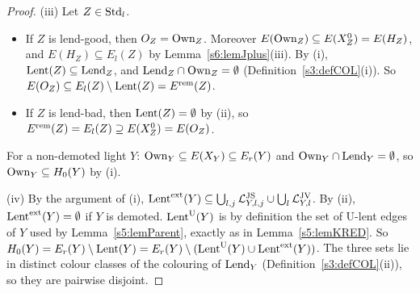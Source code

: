 \begin{proof}
(iii) Let $Z\in\mathrm{Std}_l$.
\begin{itemize}
\item If $Z$ is lend-good, then $O_Z=\mathrm{Own}_Z$. Moreover $E(\mathrm{Own}_Z)\subseteq E(X^0_Z)=E(H_Z)$, and $E(H_Z)\subseteq E_l(Z)$ by Lemma~\ref{s6:lemJplus}(iii). By (i), $\mathrm{Lent}(Z)\subseteq\mathrm{Lend}_Z$, and $\mathrm{Lend}_Z\cap\mathrm{Own}_Z=\emptyset$ (Definition~\ref{s3:defCOL}(i)). So $E(O_Z)\subseteq E_l(Z)\setminus\mathrm{Lent}(Z)=E^{\mathrm{rem}}(Z)$.
\item If $Z$ is lend-bad, then $\mathrm{Lent}(Z)=\emptyset$ by (ii), so $E^{\mathrm{rem}}(Z)=E_l(Z)\supseteq E(X^0_Z)=E(O_Z)$.
\end{itemize}
For a non-demoted light $Y$: $\mathrm{Own}_Y\subseteq E(X_Y)\subseteq E_r(Y)$ and $\mathrm{Own}_Y\cap\mathrm{Lend}_Y=\emptyset$, so $\mathrm{Own}_Y\subseteq H_0(Y)$ by (i).

(iv) By the argument of (i), $\mathrm{Lent}^{\mathrm{ext}}(Y)\subseteq\bigcup_{l,j}\mathcal{L}^{\mathrm{JS}}_{Y,l,j}\cup\bigcup_l\mathcal{L}^{\mathrm{JV}}_{Y,l}$. By (ii), $\mathrm{Lent}^{\mathrm{ext}}(Y)=\emptyset$ if $Y$ is demoted. $\mathrm{Lent}^{\mathrm{U}}(Y)$ is by definition the set of U-lent edges of $Y$ used by Lemma~\ref{s5:lemParent}, exactly as in Lemma~\ref{s5:lemKRED}. So $H_0(Y)=E_r(Y)\setminus\mathrm{Lent}(Y)=E_r(Y)\setminus(\mathrm{Lent}^{\mathrm{U}}(Y)\cup\mathrm{Lent}^{\mathrm{ext}}(Y))$. The three sets lie in distinct colour classes of the colouring of $\mathrm{Lend}_Y$ (Definition~\ref{s3:defCOL}(ii)), so they are pairwise disjoint.
\end{proof}

